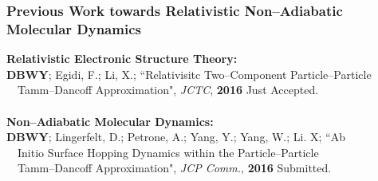 \documentclass[usepdftitle=false,10pt]{beamer}
\begin{document}
\begin{frame}
  \frametitle{Previous Work towards Relativistic Non--Adiabatic Molecular Dynamics}

  {\Large \bf Relativistic Electronic Structure Theory:}\vspace{0.1cm}\\

  \textbf{DBWY}; Egidi, F.; Li, X.; ``Relativisitc Two--Component Particle--Particle
    \\$\quad$Tamm--Dancoff Approximation", \emph{JCTC}, \textbf{2016} Just Accepted.\\

  ~\\
  {\Large \bf Non--Adiabatic Molecular Dynamics:}\vspace{0.1cm}\\

  \textbf{DBWY}; Lingerfelt, D.; Petrone, A.; Yang, Y.; Yang, W.; Li. X;
    ``Ab \\$\quad$Initio Surface Hopping Dynamics within the Particle--Particle
    \\$\quad$Tamm--Dancoff Approximation", \emph{JCP Comm.}, \textbf{2016} Submitted.\\

\end{frame}
\end{document}

